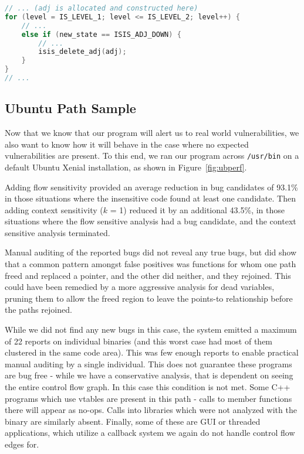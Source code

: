\begin{lstlisting}[language=C, float=t, caption={\texttt{isisd} Vulnerability}, label=lst:isisd-gueb]
// ... (adj is allocated and constructed here)
for (level = IS_LEVEL_1; level <= IS_LEVEL_2; level++) {
	// ...
	else if (new_state == ISIS_ADJ_DOWN) {
		// ...
		isis_delete_adj(adj);
	}
}
// ...
\end{lstlisting}


\subsection{Ubuntu Path Sample}
Now that we know that our program will alert us to real world vulnerabilities, we also want to know how it will behave in the case where no expected vulnerabilities are present.
To this end, we ran our program across \texttt{/usr/bin} on a default Ubuntu Xenial installation, as shown in Figure~\ref{fig:ubperf}.

Adding flow sensitivity provided an average reduction in bug candidates of 93.1\% in those situations where the insensitive code found at least one candidate.
Then adding context sensitivity ($k$ = 1) reduced it by an additional 43.5\%, in those situations where the flow sensitive analysis had a bug candidate, and the context sensitive analysis terminated.

Manual auditing of the reported bugs did not reveal any true bugs, but did show that a common pattern amongst false positives was functions for whom one path freed and replaced a pointer, and the other did neither, and they rejoined.
This could have been remedied by a more aggressive analysis for dead variables, pruning them to allow the freed region to leave the points-to relationship before the paths rejoined.

While we did not find any new bugs in this case, the system emitted a maximum of 22 reports on individual binaries (and this worst case had most of them clustered in the same code area).
This was few enough reports to enable practical manual auditing by a single individual.
This does not guarantee these programs are bug free - while we have a conservative analysis, that is dependent on seeing the entire control flow graph.
In this case this condition is not met.
Some C++ programs which use vtables are present in this path - calls to member functions there will appear as no-ops.
Calls into libraries which were not analyzed with the binary are similarly absent.
Finally, some of these are GUI or threaded applications, which utilize a callback system we again do not handle control flow edges for.
